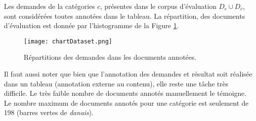  Les demandes de la catégories $c$, présentes dans le corpus d'évaluation $D_{c} \cup D_{\overline{c}}$, sont considérées toutes annotées dans le tableau. La répartition, des documents d'évaluation est donnée par l'histogramme de la Figure \ref{fig:quanta:hist-repartition-docs}.  
 
 \begin{figure}[!htb]
 	\texttt{[image: chartDataset.png]}
 	\caption{Répartitions des demandes dans les documents annotées.}\label{fig:quanta:hist-repartition-docs}
 \end{figure}
 
 Il faut aussi noter que bien que l'annotation des demandes et résultat soit réalisée dans un tableau (annotation externe au contenu), elle reste une tâche très difficile. Le très faible nombre de documents annotés manuellement le témoigne. Le nombre  maximum de documents annotés pour une catégorie est seulement de 198 (barres vertes de \textit{danais}).%





%

